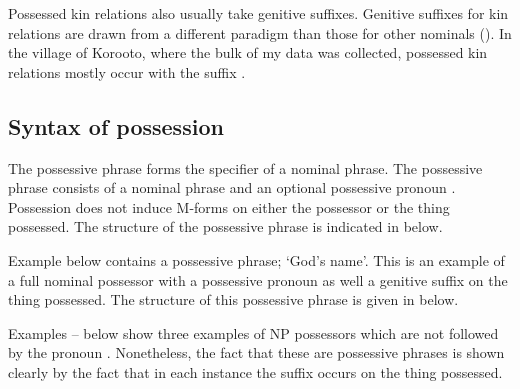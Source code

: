 Possessed kin relations also usually take genitive suffixes.
Genitive suffixes for kin relations are drawn from a different
paradigm than those for other nominals ().
In the village of Koro{\Q}oto, where the bulk of my data was collected,
possessed kin relations mostly occur with the suffix .

\subsection{Syntax of possession}\label{sec:SynPoss}
The possessive phrase forms the specifier of a nominal phrase.
The possessive phrase consists of a nominal phrase and an optional possessive pronoun .
Possession does not induce M-forms on either the possessor or the thing possessed.
The structure of the possessive phrase is indicated in  below.

\begin{exe}
	\label{tr:PossP}
\end{exe}

Example  below contains a possessive phrase;
 `God's name'.
This is an example of a full nominal possessor
with a possessive pronoun as well a genitive suffix on the thing possessed.
The structure of this possessive phrase is given in  below.

\begin{exe}
	\label{ex:130902-1, 1.34}
		\label{tr:130902-1, 1.34}
	\end{exe}

Examples --
below show three examples of NP possessors which are not followed by the pronoun .
Nonetheless, the fact that these are possessive phrases is shown clearly by the fact
that in each instance the  suffix  occurs on the thing possessed.

